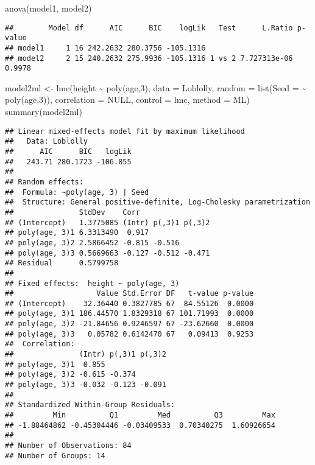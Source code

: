 \documentclass[
]{book}
\newenvironment{Shaded}{\begin{snugshade}}{\end{snugshade}}
\newcommand{\AttributeTok}[1]{\textcolor[rgb]{0.77,0.63,0.00}{#1}}
\newcommand{\ConstantTok}[1]{\textcolor[rgb]{0.00,0.00,0.00}{#1}}
\newcommand{\DecValTok}[1]{\textcolor[rgb]{0.00,0.00,0.81}{#1}}
\newcommand{\FunctionTok}[1]{\textcolor[rgb]{0.00,0.00,0.00}{#1}}
\newcommand{\NormalTok}[1]{#1}
\newcommand{\OtherTok}[1]{\textcolor[rgb]{0.56,0.35,0.01}{#1}}
\newcommand{\SpecialCharTok}[1]{\textcolor[rgb]{0.00,0.00,0.00}{#1}}
\newcommand{\StringTok}[1]{\textcolor[rgb]{0.31,0.60,0.02}{#1}}
\begin{document}
\begin{Shaded}
\begin{Highlighting}[]
\FunctionTok{anova}\NormalTok{(model1, model2)}
\end{Highlighting}
\end{Shaded}

\begin{verbatim}
##        Model df      AIC      BIC    logLik   Test      L.Ratio p-value
## model1     1 16 242.2632 280.3756 -105.1316                            
## model2     2 15 240.2632 275.9936 -105.1316 1 vs 2 7.727313e-06  0.9978
\end{verbatim}

\begin{Shaded}
\begin{Highlighting}[]
\NormalTok{model2ml }\OtherTok{\textless{}{-}} \FunctionTok{lme}\NormalTok{(height }\SpecialCharTok{\textasciitilde{}} \FunctionTok{poly}\NormalTok{(age,}\DecValTok{3}\NormalTok{), }\AttributeTok{data =}\NormalTok{ Loblolly,}
\AttributeTok{random =} \FunctionTok{list}\NormalTok{(}\AttributeTok{Seed =} \SpecialCharTok{\textasciitilde{}} \FunctionTok{poly}\NormalTok{(age,}\DecValTok{3}\NormalTok{)),}
\AttributeTok{correlation =} \ConstantTok{NULL}\NormalTok{, }\AttributeTok{control =}\NormalTok{ lmc, }\AttributeTok{method =} \StringTok{\textquotesingle{}ML\textquotesingle{}}\NormalTok{)}
\FunctionTok{summary}\NormalTok{(model2ml)}
\end{Highlighting}
\end{Shaded}

\begin{verbatim}
## Linear mixed-effects model fit by maximum likelihood
##   Data: Loblolly 
##      AIC      BIC   logLik
##   243.71 280.1723 -106.855
## 
## Random effects:
##  Formula: ~poly(age, 3) | Seed
##  Structure: General positive-definite, Log-Cholesky parametrization
##               StdDev    Corr                
## (Intercept)   1.3775085 (Intr) p(,3)1 p(,3)2
## poly(age, 3)1 6.3313490  0.917              
## poly(age, 3)2 2.5866452 -0.815 -0.516       
## poly(age, 3)3 0.5669663 -0.127 -0.512 -0.471
## Residual      0.5799758                     
## 
## Fixed effects:  height ~ poly(age, 3) 
##                   Value Std.Error DF   t-value p-value
## (Intercept)    32.36440 0.3827785 67  84.55126  0.0000
## poly(age, 3)1 186.44570 1.8329318 67 101.71993  0.0000
## poly(age, 3)2 -21.84656 0.9246597 67 -23.62660  0.0000
## poly(age, 3)3   0.05782 0.6142470 67   0.09413  0.9253
##  Correlation: 
##               (Intr) p(,3)1 p(,3)2
## poly(age, 3)1  0.855              
## poly(age, 3)2 -0.615 -0.374       
## poly(age, 3)3 -0.032 -0.123 -0.091
## 
## Standardized Within-Group Residuals:
##         Min          Q1         Med          Q3         Max 
## -1.88464862 -0.45304446 -0.03409533  0.70340275  1.60926654 
## 
## Number of Observations: 84
## Number of Groups: 14
\end{verbatim}
\end{document}
